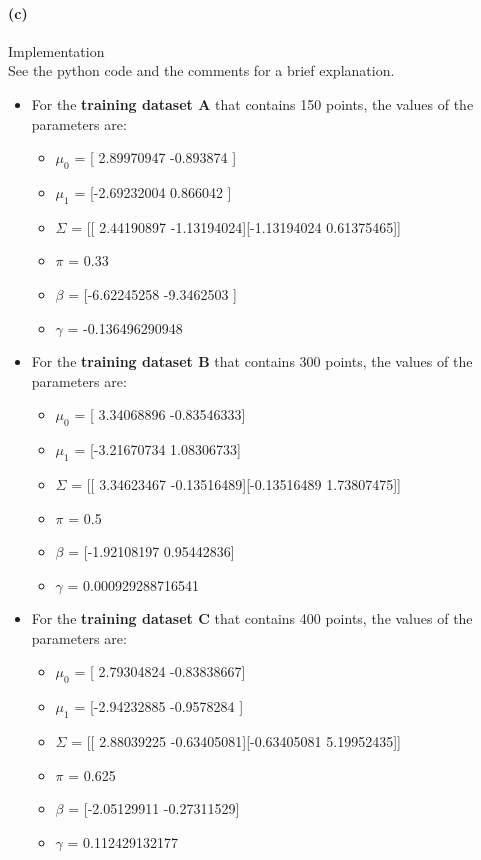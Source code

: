 \documentclass[11pt]{article}
\numberwithin{figure}{section} %
\begin{document}
\paragraph{(c)} Implementation \\
See the python code and the comments for a brief explanation.
\begin{itemize}
\item For the \textbf{training dataset A} that contains 150 points, the values of the parameters are:
	\begin{itemize}
		\item $\mu_0$ = [ 2.89970947 -0.893874  ]
		\item $\mu_1$ = [-2.69232004  0.866042  ]
		\item $\Sigma$ = [[ 2.44190897 -1.13194024][-1.13194024  0.61375465]]
		\item $\pi$ = 0.33
		\item $\beta$ = [-6.62245258 -9.3462503 ]
		\item $\gamma$ = -0.136496290948
	\end{itemize}

\item For the \textbf{training dataset B} that contains 300 points, the values of the parameters are:
	\begin{itemize}
		\item $\mu_0$ = [ 3.34068896 -0.83546333]
		\item $\mu_1$ = [-3.21670734  1.08306733]
		\item $\Sigma$ = [[ 3.34623467 -0.13516489][-0.13516489  1.73807475]]
		\item $\pi$ = 0.5
		\item $\beta$ = [-1.92108197  0.95442836]
		\item $\gamma$ = 0.000929288716541
	\end{itemize}

\item For the \textbf{training dataset C} that contains 400 points, the values of the parameters are:
	\begin{itemize}
		\item $\mu_0$ = [ 2.79304824 -0.83838667]
		\item $\mu_1$ = [-2.94232885 -0.9578284 ]
		\item $\Sigma$ = [[ 2.88039225 -0.63405081][-0.63405081  5.19952435]]
		\item $\pi$ = 0.625
		\item $\beta$ = [-2.05129911 -0.27311529]
		\item $\gamma$ = 0.112429132177
	\end{itemize}
\end{itemize}
\end{document}
